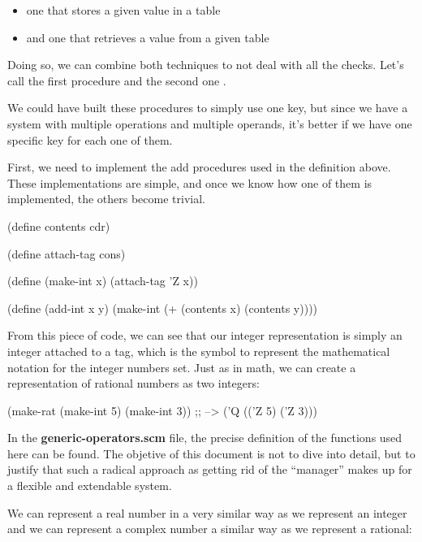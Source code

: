 \begin{itemize}
  \item one that stores a given value in a table
  \item and one that retrieves a value from a given table
\end{itemize}

Doing so, we can combine both techniques to not deal with all the checks. Let's call the first procedure  and the second one .

\vspace{-15pt}

We could have built these procedures to simply use one key, but since we have a system with multiple operations and multiple operands, it's better if we have one specific key for each one of them.

First, we need to implement the add procedures used in the  definition above. These implementations are simple, and once we know how one of them is implemented, the others become trivial.

\begin{code}
(define contents cdr)

(define attach-tag cons)

(define (make-int x)
  (attach-tag 'Z x))

(define (add-int x y)
  (make-int (+ (contents x)
               (contents y))))
\end{code}

From this piece of code, we can see that our integer representation is simply an integer attached to a tag, which is the symbol  to represent the mathematical notation for the integer numbers set. Just as in math, we can create a representation of rational numbers as two integers:

\begin{code}
(make-rat (make-int 5) (make-int 3)) ;; --> ('Q (('Z 5) ('Z 3)))
\end{code}

In the \textbf{generic-operators.scm} file, the precise definition of the functions used here can be found. The objetive of this document is not to dive into detail, but to justify that such a radical approach as getting rid of the ``manager'' makes up for a flexible and extendable system.

We can represent a real number in a very similar way as we represent an integer and we can represent a complex number a similar way as we represent a rational:

